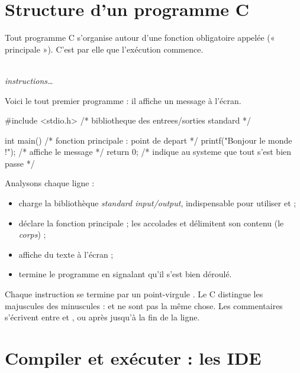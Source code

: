 \section{Structure d'un programme C}

Tout programme C s'organise autour d'une fonction obligatoire appelée
 (« principale »). C'est par elle que l'exécution commence.

\begin{syntaxe}
\\[2pt]
\quad \textit{instructions\dots}\quad {}
\end{syntaxe}

Voici le tout premier programme : il affiche un message à l'écran.

\begin{codec}
#include <stdio.h>   /* bibliotheque des entrees/sorties standard */

int main()           /* fonction principale : point de depart */
{
    printf("Bonjour le monde !\n");  /* affiche le message */
    return 0;        /* indique au systeme que tout s'est bien passe */
}
\end{codec}


Analysons chaque ligne :
\begin{itemize}
  \item {} charge la bibliothèque \emph{standard
    input/output}, indispensable pour utiliser  et  ;
  \item {} déclare la fonction principale ; les accolades
    \code{\{} et \code{\}} délimitent son contenu (le \emph{corps}) ;
  \item {} affiche du texte à l'écran ;
  \item {} termine le programme en signalant qu'il s'est bien
    déroulé.
\end{itemize}

\begin{attention}
Chaque instruction se termine par un point-virgule \code{;}. Le C distingue les
majuscules des minuscules :  et  ne sont pas la même chose.
Les commentaires s'écrivent entre \code{/*} et \code{*/}, ou après \code{//}
jusqu'à la fin de la ligne.
\end{attention}

\section{Compiler et exécuter : les IDE}


